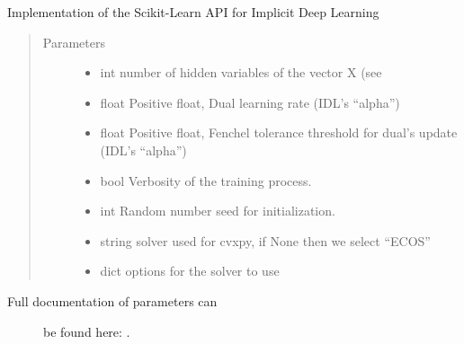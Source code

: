 \documentclass[letterpaper,10pt,english]{sphinxmanual}
\begin{document}
\begin{fulllineitems}
\label{\detokenize{sections/prediction:IDL.IDLModel}}
Implementation of the Scikit-Learn API for Implicit Deep Learning
\begin{quote}\begin{description}
\item[{Parameters}] \leavevmode\begin{itemize}
\item {} 
 \textendash{} int
number of hidden variables of the vector X (see

\item {} 
 \textendash{} float
Positive float, Dual learning rate (IDL’s “alpha”)

\item {} 
 \textendash{} float
Positive float, Fenchel tolerance threshold for dual’s update (IDL’s “alpha”)

\item {} 
 \textendash{} bool
Verbosity of the training process.

\item {} 
 \textendash{} int
Random number seed for initialization.

\item {} 
 \textendash{} string
solver used for cvxpy, if None then we select “ECOS”

\item {} 
 \textendash{} dict
options for the solver to use

\end{itemize}

\end{description}\end{quote}
\begin{description}
\item[{Full documentation of parameters can}] \leavevmode
be found here: .


\end{description}
\end{fulllineitems}
\end{document}
